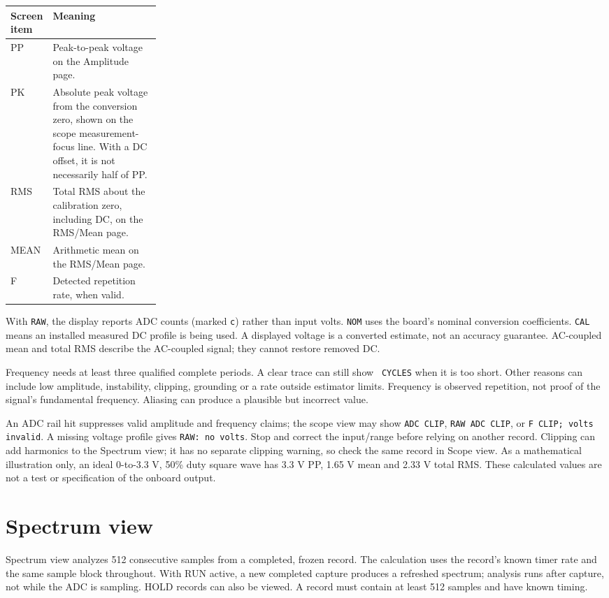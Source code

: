 \documentclass[10pt,a4paper]{article}
\newcommand{\lcd}[1]{\texttt{#1}}
\newcommand{\manualpage}[2]{\clearpage\section{#1}\label{#2}}
\begin{document}
\begin{tabularx}{\linewidth}{@{}p{0.25\linewidth}X@{}}
\toprule
Screen item & Meaning \\
\midrule
PP & Peak-to-peak voltage on the Amplitude page. \\
PK & Absolute peak voltage from the conversion zero, shown on the scope measurement-focus line. With a DC offset, it is not necessarily half of PP. \\
RMS & Total RMS about the calibration zero, including DC, on the RMS/Mean page. \\
MEAN & Arithmetic mean on the RMS/Mean page. \\
F & Detected repetition rate, when valid. \\
\bottomrule
\end{tabularx}

With \lcd{RAW}, the display reports ADC counts (marked \lcd{c}) rather than input volts. \lcd{NOM} uses the board's nominal conversion coefficients. \lcd{CAL} means an installed measured DC profile is being used. A displayed voltage is a converted estimate, not an accuracy guarantee. AC-coupled mean and total RMS describe the AC-coupled signal; they cannot restore removed DC.

Frequency needs at least three qualified complete periods. A clear trace can still show \lcd{\kern0pt\char45\ CYCLES} when it is too short. Other reasons can include low amplitude, instability, clipping, grounding or a rate outside estimator limits. Frequency is observed repetition, not proof of the signal's fundamental frequency. Aliasing can produce a plausible but incorrect value.

An ADC rail hit suppresses valid amplitude and frequency claims; the scope view may show \lcd{ADC CLIP}, \lcd{RAW ADC CLIP}, or \lcd{F \kern0pt\char45 CLIP; volts invalid}. A missing voltage profile gives \lcd{RAW: no volts}. Stop and correct the input/range before relying on another record. Clipping can add harmonics to the Spectrum view; it has no separate clipping warning, so check the same record in Scope view. As a mathematical illustration only, an ideal 0-to-3.3 V, 50\% duty square wave has 3.3 V PP, 1.65 V mean and 2.33 V total RMS. These calculated values are not a test or specification of the onboard output.

\manualpage{Spectrum view}{spectrum}

Spectrum view analyzes 512 consecutive samples from a completed, frozen record. The calculation uses the record's known timer rate and the same sample block throughout. With RUN active, a new completed capture produces a refreshed spectrum; analysis runs after capture, not while the ADC is sampling. HOLD records can also be viewed. A record must contain at least 512 samples and have known timing.
\end{document}
